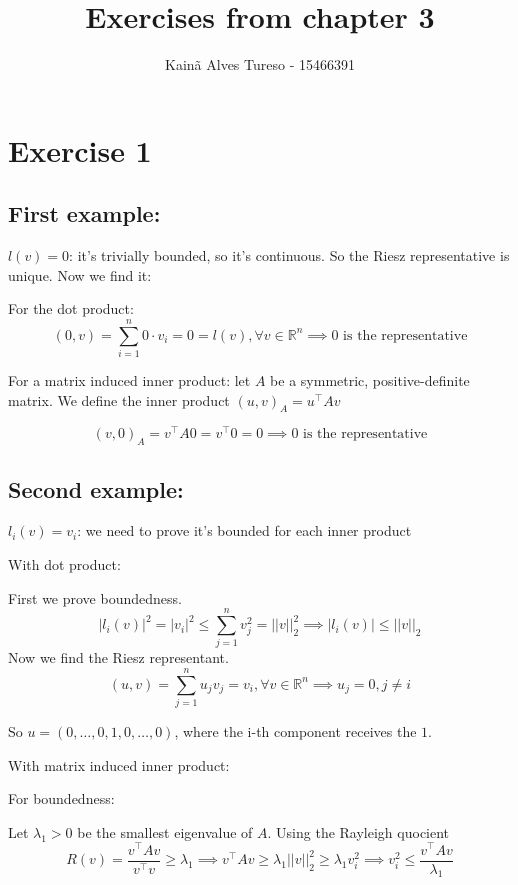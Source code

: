 \documentclass{article}
\title{Exercises from chapter 3}
\author{Kainã Alves Tureso - 15466391}
\begin{document}
    \maketitle

    \section*{Exercise 1}
    \subsection*{First example:} 

    $l(v) = 0$: it's trivially bounded, so it's continuous. So the Riesz representative is unique. Now we find it:

    For the dot product:
    \[
        (0, v) = \sum_{i=1}^{n}0 \cdot v_i = 0 = l(v), \forall v \in \mathbb{R}^n \implies 0 \text{ is the representative}
    \]

    For a matrix induced inner product: let $A$ be a symmetric, positive-definite matrix. We define the inner product $(u,v)_A = u^\top A v$

    \[
        (v, 0)_A = v^\top A 0 = v^\top 0 = 0 \implies 0 \text{ is the representative}
    \]


    \subsection*{Second example:}

    $l_i(v) = v_i$: we need to prove it's bounded for each inner product

    With dot product:

    First we prove boundedness.
    \[
        |l_i(v)|^2 = |v_i|^2 \le \sum_{j=1}^{n} v_j^2 = ||v||_2^2 \implies |l_i(v)| \le ||v||_2
    \]
    Now we find the Riesz representant.
    \[
        (u,v) = \sum_{j=1}^{n}u_j v_j = v_i, \forall v \in \mathbb{R}^n \implies u_j = 0, j\ne i
    \]

    So $u = (0, \dots, 0, 1, 0, \dots, 0)$, where the i-th component receives the $1$.

    With matrix induced inner product:

    For boundedness:
    
    Let $\lambda_1 > 0$ be the smallest eigenvalue of $A$. Using the Rayleigh quocient
    \[
        R(v) = \frac{v^\top A v}{v^\top v} \ge \lambda_1 \implies v^\top A v \ge \lambda_1 ||v||_2^2 \ge \lambda_1 v_i^2 \implies v_i^2 \le \frac{v^\top A v}{\lambda_1}
    \]
\end{document}
